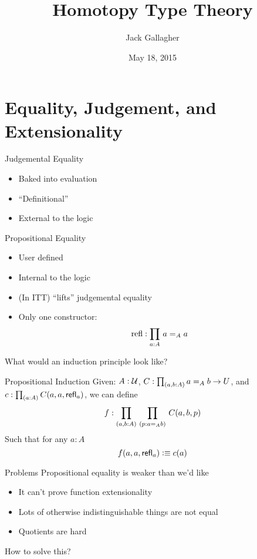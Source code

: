\documentclass[xcolor=svgnames]{beamer}
\title
  [Homotopy Type Theory\hspace{2em}]
  {Homotopy Type Theory}
\author
  [Jack Gallagher]
  {Jack Gallagher}
\date{May 18, 2015}
\begin{document}
\maketitle

\section{Equality, Judgement, and Extensionality}
\begin{frame}{Judgemental Equality}
  \begin{itemize}
  \item Baked into evaluation
  \item ``Definitional''
  \item External to the logic
  \end{itemize}
\end{frame}

\begin{frame}{Propositional Equality}
  \begin{itemize}
  \item User defined
  \item Internal to the logic
  \item (In ITT) ``lifts'' judgemental equality
  \item Only one constructor: \pause
    $$ \mathrm{refl} : \prd{a:A} a =_A a $$
  \end{itemize} \pause

  What would an induction principle look like?
\end{frame}

\begin{frame}{Propositional Induction}
  Given: $A : \mathcal{U}$, $C : \prd{a,b : A} a =_A b \to U$,
  and $c : \prd{a:A} C(a,a,\refl{a})$, we can define
  $$ f : \prd{a,b:A}{p : a =_A b} C(a,b,p) $$
  Such that for any $a:A$
  $$ f(a,a,\mathsf{refl}_{a} ) \vcentcolon\equiv c(a) $$
\end{frame}

\begin{frame}{Problems}
  Propositional equality is weaker than we'd like
  \begin{itemize}
  \item It can't prove function extensionality \pause
  \item Lots of otherwise indistinguishable things are not equal \pause
  \item Quotients are hard \pause
  \end{itemize}

  How to solve this?
\end{frame}
\end{document}
